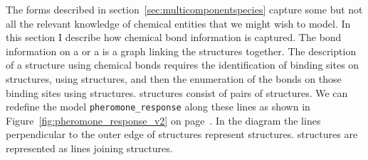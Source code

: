 \documentclass{cekarticle}
\begin{document}
The forms described in section~\ref{sec:multicomponentspecies}
capture some but not all the relevant knowledge of chemical
entities that we might wish to model.  In this section I describe
how chemical bond information is captured. The bond information on
a  or a  is a
graph linking the  structures together.
The description of a structure using chemical bonds requires the
identification of binding sites on  structures,
using  structures, and then the enumeration of
the bonds on those binding sites using 
structures.  structures consist of pairs of
 structures. We can redefine the model
\texttt{pheromone\_response} along these lines as shown in
Figure~\ref{fig:pheromone_response_v2} on
page~\pageref{fig:pheromone_response_v2}.  In the diagram the
lines perpendicular to the outer edge of 
structures represent  structures.
 structures are represented as lines joining
 structures.
\end{document}
